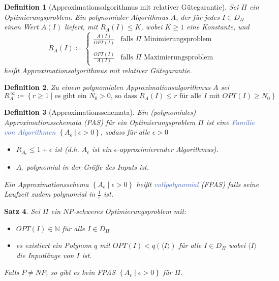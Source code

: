 \documentclass[11pt]{scrartcl}
\newcommand{\tcol}[1]{\textcolor{RoyalBlue}{#1}}
\newcommand{\set}[1]{\left\lbrace #1\right\rbrace}
\theoremstyle{break}
\newtheorem{satz}{Satz}[section]
\newtheorem{defi}[satz]{Definition}
\begin{document}
    \begin{defi}[Approximationsalgorithmus mit relativer Gütegarantie]
        Sei $\Pi$ ein Optimierungsproblem.
        Ein polynomialer Algorithmus $A$, der für jedes $I\in D_\Pi$ einen Wert $A(I)$ liefert, mit $R_A(I)\leq K$, wobei $K\geq 1$ eine Konstante, und
        \[R_A(I)\coloneqq
        \begin{cases}
            \frac{A(I)}{OPT(I)} & \text{falls $\Pi$ Minimierungsproblem}\\
            & \\
            \frac{OPT(I)}{A(I)} & \text{falls $\Pi$ Maximierungsproblem}
        \end{cases}
        \]
        heißt Approximationsalgorithmus mit relativer Gütegarantie.
    \end{defi}

    \begin{defi}
        Zu einem polynomialen Approximationsalgorithmus $A$ sei
        \[R^{\,\infty}_A\coloneqq\set{r\geq 1 \mid\text{es gibt ein $N_0>0$, so dass $R_A(I)\leq r$ für alle $I$ mit $OPT(I)\geq N_0$}}\]
    \end{defi}

    \begin{defi}[Approximationsschemata]
        Ein (polynomiales) Approximationsschemata (PAS) für ein Optimierungsproblem $\Pi$ ist eine \tcol{Familie von Algorithmen} $\set{A_\epsilon\mid\epsilon>0}$, sodass für alle $\epsilon>0$
        \begin{itemize}
            \item $R_{A_\epsilon}\leq 1+\epsilon$ ist (d.h. $A_\epsilon$ ist ein $\epsilon$-approximierender Algorithmus).
            \item $A_\epsilon$ polynomial in der Größe des Inputs ist.
        \end{itemize}
        Ein Approximationsschema $\set{A_\epsilon\mid\epsilon>0}$ heißt \tcol{vollpolynomial} (FPAS) falls seine Laufzeit zudem polynomial in $\frac{1}{\epsilon}$ ist.
    \end{defi}

    \begin{satz}
        Sei $\Pi$ ein $NP$-schweres Optimierungsproblem mit:
        \begin{itemize}
            \item $OPT(I)\in\mathbb{N}$ für alle $I\in D_\Pi$
            \item es existiert ein Polynom $q$ mit $OPT(I)<q(\langle I\rangle)$ für alle $I\in D_\Pi$ wobei $\langle I\rangle$ die Inputlänge von $I$ ist.
        \end{itemize}
        Falls $P\neq NP$, so gibt es kein FPAS $\set{A_\epsilon\mid\epsilon>0}$ für $\Pi$.
    \end{satz}
\end{document}
